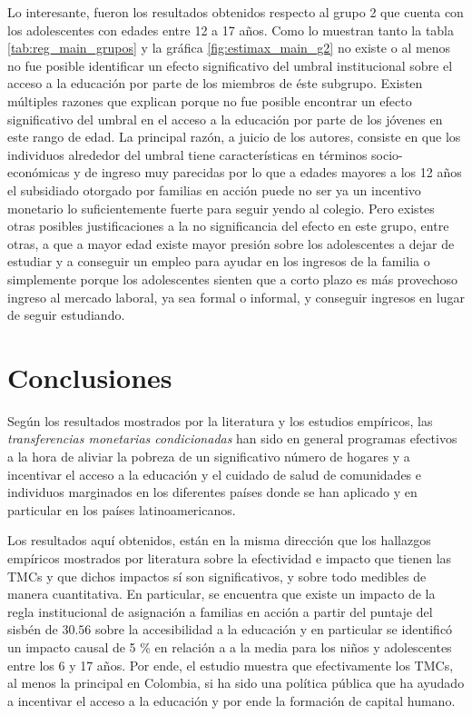 \documentclass[AER]{AEA}
\begin{document}
Lo interesante, fueron los resultados obtenidos respecto al grupo 2 que cuenta con los adolescentes con edades entre 12 a 17 años. Como lo muestran tanto la tabla \ref{tab:reg_main_grupos} y la gráfica \ref{fig:estimax_main_g2} no existe o al menos no fue posible identificar un efecto significativo del umbral institucional sobre el acceso a la educación por parte de los miembros de éste subgrupo. Existen múltiples razones que explican porque no fue posible encontrar un efecto significativo del umbral en el acceso a la educación por parte de los jóvenes en este rango de edad. La principal razón, a juicio de los autores, consiste en que los individuos alrededor del umbral tiene características en términos socio-económicas y de ingreso muy parecidas por lo que a edades mayores a los 12 años el subsidiado otorgado por familias en acción puede no ser ya un incentivo monetario lo suficientemente fuerte para seguir yendo al colegio. Pero existes otras posibles justificaciones a la no significancia del efecto en este grupo, entre otras, a que a mayor edad existe mayor presión sobre los adolescentes a dejar de estudiar y a conseguir un empleo para ayudar en los ingresos de la familia o simplemente porque los adolescentes sienten que a corto plazo es más provechoso ingreso al mercado laboral, ya sea formal o informal, y conseguir ingresos en lugar de seguir estudiando. 

\section{Conclusiones}

Según los resultados mostrados por la literatura y los estudios empíricos, las \textit{transferencias monetarias condicionadas} han sido en general programas efectivos a la hora de aliviar la pobreza de un significativo número de hogares y a incentivar el acceso a la educación y el cuidado de salud de comunidades e individuos marginados en los diferentes países donde se han aplicado y en particular en los países latinoamericanos. 

Los resultados aquí obtenidos, están en la misma dirección que los hallazgos empíricos mostrados por literatura sobre la efectividad e impacto que tienen las TMCs y que dichos impactos sí son significativos, y sobre todo medibles de manera cuantitativa. En particular, se encuentra que existe un impacto de la regla institucional de asignación a familias en acción a partir del puntaje del sisbén de $30.56$ sobre la accesibilidad a la educación y en particular se identificó un impacto causal de 5 \% en relación a a la media para los niños y adolescentes entre los 6 y 17 años. Por ende, el estudio muestra que efectivamente los TMCs, al menos la principal en Colombia, si ha sido una política pública que ha ayudado a incentivar el acceso a la educación y por ende la formación de capital humano. 
\end{document}
